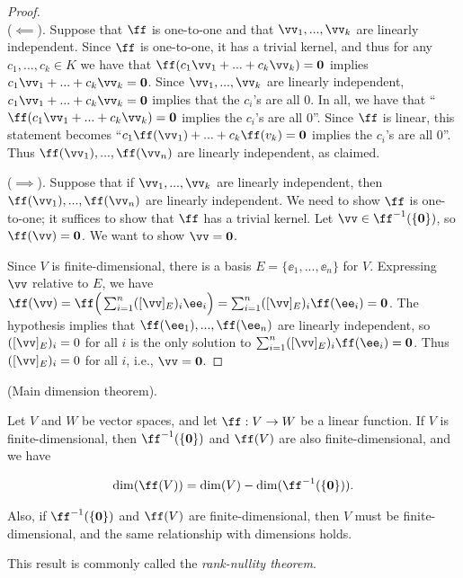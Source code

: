 \begin{proof}
    \mbox{} \\
    \indent ($\impliedby$). Suppose that $\ff$ is one-to-one and that $\vv_1, ..., \vv_k$ are linearly independent. Since $\ff$ is one-to-one, it has a trivial kernel, and thus for any $c_1, ..., c_k \in K$ we have that $\ff(c_1 \vv_1 + ... + c_k \vv_k) = \mathbf{0}$ implies $c_1 \vv_1 + ... + c_k \vv_k = \mathbf{0}$. Since $\vv_1, ..., \vv_k$ are linearly independent, $c_1 \vv_1 + ... + c_k \vv_k = \mathbf{0}$ implies that the $c_i$'s are all $0$. In all, we have that ``$\ff(c_1 \vv_1 + ... + c_k \vv_k) = \mathbf{0}$ implies the $c_i$'s are all $0$''. Since $\ff$ is linear, this statement becomes  ``$c_1 \ff(\vv_1) + ... + c_k \ff(v_k) = \mathbf{0}$ implies the $c_i$'s are all $0$''. Thus $\ff(\vv_1), ..., \ff(\vv_n)$ are linearly independent, as claimed.
    
    ($\implies$). Suppose that if $\vv_1, ..., \vv_k$ are linearly independent, then $\ff(\vv_1), ..., \ff(\vv_n)$ are linearly independent. We need to show $\ff$ is one-to-one; it suffices to show that $\ff$ has a trivial kernel. Let $\vv \in \ff^{-1}(\{\mathbf{0}\})$, so $\ff(\vv) = \mathbf{0}$. We want to show $\vv = \mathbf{0}$. 
    
    Since $V$ is finite-dimensional, there is a basis $E = \{\ee_1, ..., \ee_n\}$ for $V$. Expressing $\vv$ relative to $E$, we have $\ff(\vv) = \ff\Big(\sum_{i = 1}^n ([\vv]_E)_i \ee_i\Big) = \sum_{i = 1}^n ([\vv]_E)_i \ff(\ee_i) = \mathbf{0}$. The hypothesis implies that $\ff(\ee_1), ..., \ff(\ee_n)$ are linearly independent, so $([\vv]_E)_i = 0$ for all $i$ is the only solution to $\sum_{i = 1}^n ([\vv]_E)_i \ff(\ee_i) = \mathbf{0}$. Thus $([\vv]_E)_i = 0$ for all $i$, i.e., $\vv = \mathbf{0}$.
\end{proof}

\begin{theorem}
\label{ch::lin_alg::thm::main_dim}
    (Main dimension theorem).
    
    Let $V$ and $W$ be vector spaces, and let $\ff:V \rightarrow W$ be a linear function. If $V$ is finite-dimensional, then $\ff^{-1}(\{\mathbf{0}\})$ and $\ff(V)$ are also finite-dimensional, and we have

    \begin{align*}
        \dim(\ff(V)) = \dim(V) - \dim(\ff^{-1}(\{\mathbf{0}\})).
    \end{align*}
    
    Also, if $\ff^{-1}(\{\mathbf{0}\})$ and $\ff(V)$ are finite-dimensional, then $V$ must be finite-dimensional, and the same relationship with dimensions holds.
    
    This result is commonly called the \textit{rank-nullity theorem}.
\end{theorem}

